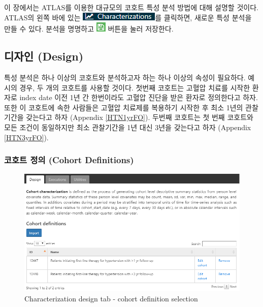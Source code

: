 \documentclass[11pt]{book}
\theoremstyle{definition}
\theoremstyle{definition}
\theoremstyle{definition}
\theoremstyle{remark}
\begin{document}
이 장에서는 ATLAS를 이용한 대규모의 코호트 특성 분석 방법에 대해 설명할
것이다. ATLAS의 왼쪽 바에 있는
\includegraphics{images/Characterization/atlasCharacterizationMenuItem.png}를
클릭하면, 새로운 특성 분석을 만들 수 있다. 분석을 명명하고
\includegraphics{images/PopulationLevelEstimation/save.png} 버튼을 눌러
저장한다.

\subsection{디자인 (Design)}\label{-design}

특성 분석은 하나 이상의 코호트와 분석하고자 하는 하나 이상의 속성이
필요하다. 예시의 경우, 두 개의 코호트를 사용할 것이다. 첫번째 코호트는
고혈압 치료를 시작한 환자로 index date 이전 1년 간 한번이라도 고혈압
진단을 받은 환자로 정의한다고 하자. 또한 이 코호트에 속한 사람들은
고혈압 치료제를 복용하기 시작한 후 최소 1년의 관찰 기간을 갖는다고 하자
(Appendix \ref{HTN1yrFO}). 두번째 코호트는 첫 번째 코호트와 모든 조건이
동일하지만 최소 관찰기간을 1년 대신 3년을 갖는다고 하자 (Appendix
\ref{HTN3yrFO}).

\subsubsection*{코호트 정의 (Cohort
Definitions)}\label{--cohort-definitions}

\begin{figure}

{\centering \includegraphics[width=1\linewidth]{images/Characterization/atlasCharacterizationCohortSelection} 

}

\caption{Characterization design tab - cohort definition selection}\label{fig:atlasCharacterizationCohortSelection}
\end{figure}
\end{document}

